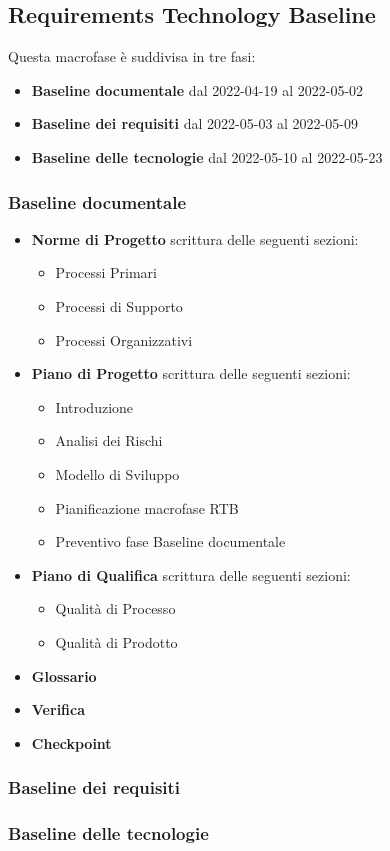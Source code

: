 \subsection{Requirements Technology Baseline}
Questa macrofase è suddivisa in tre fasi:
\begin{itemize}
    \item \textbf{Baseline documentale} dal 2022-04-19 al 2022-05-02
    \item \textbf{Baseline dei requisiti} dal 2022-05-03 al 2022-05-09
    \item \textbf{Baseline delle tecnologie} dal 2022-05-10 al 2022-05-23
\end{itemize}

\subsubsection{Baseline documentale}
\begin{itemize}
    \item \textbf{Norme di Progetto} scrittura delle seguenti sezioni:
        \begin{itemize}
            \item Processi Primari
            \item Processi di Supporto
            \item Processi Organizzativi
        \end{itemize}
    \item \textbf{Piano di Progetto} scrittura delle seguenti sezioni:
        \begin{itemize}
            \item Introduzione
            \item Analisi dei Rischi
            \item Modello di Sviluppo
            \item Pianificazione macrofase RTB
            \item Preventivo fase Baseline documentale
        \end{itemize}
    \item \textbf{Piano di Qualifica} scrittura delle seguenti sezioni:
        \begin{itemize}
            \item Qualità di Processo
            \item Qualità di Prodotto
        \end{itemize}
    \item \textbf{Glossario}
    \item \textbf{Verifica}
    \item \textbf{Checkpoint} 
\end{itemize}

\subsubsection{Baseline dei requisiti}

\subsubsection{Baseline delle tecnologie}